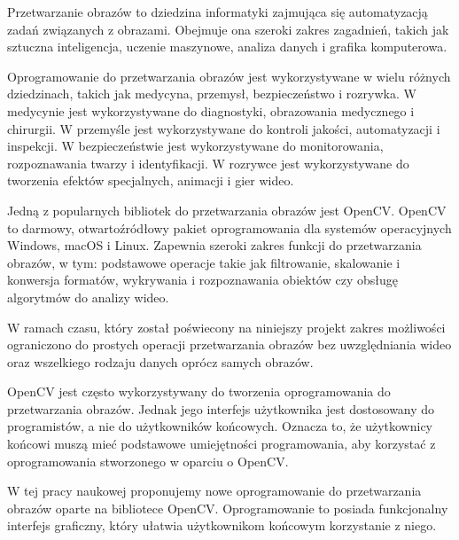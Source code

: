 
Przetwarzanie obrazów to dziedzina informatyki zajmująca się automatyzacją zadań związanych z obrazami. Obejmuje ona szeroki zakres zagadnień, takich jak sztuczna inteligencja, uczenie maszynowe, analiza danych i grafika komputerowa.

Oprogramowanie do przetwarzania obrazów jest wykorzystywane w wielu różnych dziedzinach, takich jak medycyna, przemysł, bezpieczeństwo i rozrywka. W medycynie jest wykorzystywane do diagnostyki, obrazowania medycznego i chirurgii. W przemyśle jest wykorzystywane do kontroli jakości, automatyzacji i inspekcji. W bezpieczeństwie jest wykorzystywane do monitorowania, rozpoznawania twarzy i identyfikacji. W rozrywce jest wykorzystywane do tworzenia efektów specjalnych, animacji i gier wideo.

Jedną z popularnych bibliotek do przetwarzania obrazów jest OpenCV. OpenCV to darmowy, otwartoźródłowy pakiet oprogramowania dla systemów operacyjnych Windows, macOS i Linux. Zapewnia szeroki zakres funkcji do przetwarzania obrazów, w tym: podstawowe operacje takie jak filtrowanie, skalowanie i konwersja formatów, wykrywania i rozpoznawania obiektów czy obsługę algorytmów do analizy wideo.

W ramach czasu, który został poświecony na niniejszy projekt zakres możliwości ograniczono do prostych operacji przetwarzania obrazów bez uwzględniania wideo oraz wszelkiego rodzaju danych oprócz samych obrazów. 

OpenCV jest często wykorzystywany do tworzenia oprogramowania do przetwarzania obrazów. Jednak jego interfejs użytkownika jest dostosowany do programistów, a nie do użytkowników końcowych. Oznacza to, że użytkownicy końcowi muszą mieć podstawowe umiejętności programowania, aby korzystać z oprogramowania stworzonego w oparciu o OpenCV.

W tej pracy naukowej proponujemy nowe oprogramowanie do przetwarzania obrazów oparte na bibliotece OpenCV. Oprogramowanie to posiada funkcjonalny interfejs graficzny, który ułatwia użytkownikom końcowym korzystanie z niego.